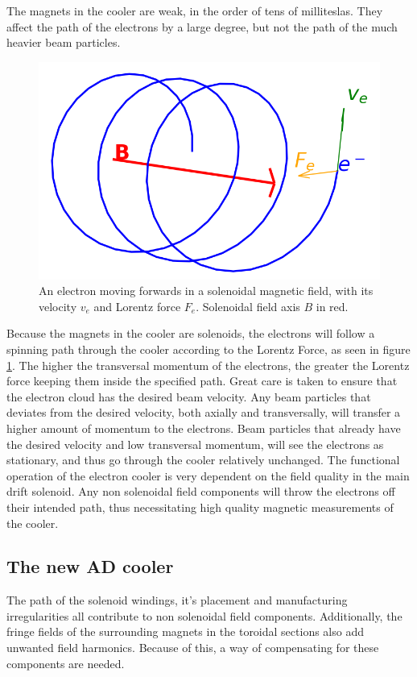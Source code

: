 The magnets in the cooler are weak, in the order of tens of milliteslas.
They affect the path of the electrons by a large degree, but
not the path of the much heavier beam particles.

\begin{figure}[!h]
    \centering
    \centering
    \includegraphics[width=0.6\linewidth]{figs/epath}
    \caption{An electron moving forwards in a solenoidal magnetic field,
        with its velocity $v_e$ and Lorentz force $F_e$. Solenoidal field axis $B$ in red.}
    \label{fig:epath}
\end{figure}

Because the magnets in the cooler are solenoids, the electrons will follow a
spinning path through the cooler according to the Lorentz Force, as seen in
figure \ref{fig:epath}. The higher the transversal momentum of the electrons,
the greater the Lorentz force keeping them inside the specified path.
Great care is taken to ensure that the electron cloud has the desired
beam velocity. Any beam particles that deviates from the desired
velocity, both axially and transversally, will transfer a higher amount
of momentum to the electrons. Beam particles that already have the desired
velocity and low transversal momentum, will see the electrons as stationary,
and thus go through the cooler relatively unchanged. \cite{d_functional_2023-fs}
The functional operation
of the electron cooler is very dependent on the field quality in the
main drift solenoid. Any non solenoidal field components will throw
the electrons off their intended path, thus necessitating high quality
magnetic measurements of the cooler.
\subsection{The new AD cooler}
The path of the solenoid windings, it's placement and manufacturing
irregularities all contribute to non solenoidal field components.
Additionally, the fringe fields of the surrounding magnets in the
toroidal sections also add unwanted field harmonics. Because of this,
a way of compensating for these components are needed.

